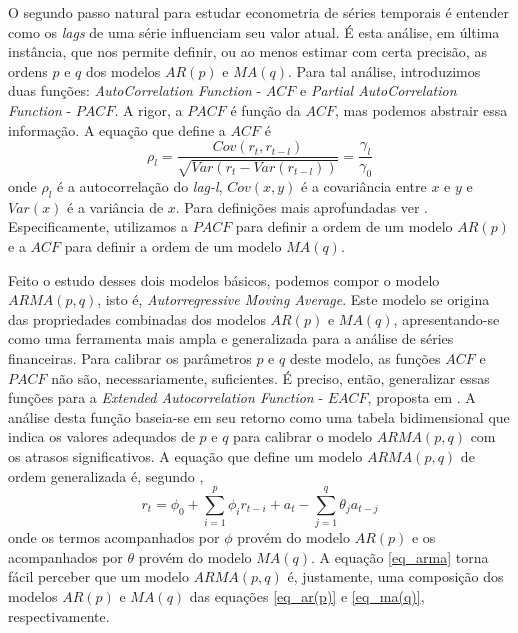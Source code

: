 \documentclass[12pt]{article}
\begin{document}
O segundo passo natural para estudar econometria de séries temporais é entender como os \textit{lags} de uma série influenciam seu valor atual. É esta análise, em última instância, que nos permite definir, ou ao menos estimar com certa precisão, as ordens $p$ e $q$ dos modelos $AR(p)$ e $MA(q)$. Para tal análise, introduzimos duas funções: \textit{AutoCorrelation Function } - $ACF $ e \textit{Partial AutoCorrelation Function } - $ PACF $. A rigor, a $ PACF $ é função da $ ACF $, mas podemos abstrair essa informação. A equação que define a $ ACF $ é
\begin{equation}\label{eq_acf}
\rho_{l}=\dfrac{Cov(r_{t},r_{t-l})}{\sqrt{Var(r_{t}-Var(r_{t-l}))}}=\dfrac{\gamma_{l}}{\gamma_{0}}
\end{equation}
onde $\rho_{l}$ é a autocorrelação do \textit{lag-l}, $Cov(x,y)$ é a covariância entre $x$ e $y$ e $Var(x)$ é a variância de $x$. Para definições mais aprofundadas ver \cite{Tsay}. Especificamente, utilizamos a $PACF$ para definir a ordem de um modelo $AR(p)$ e a $ACF$ para definir a ordem de um modelo $MA(q)$.

Feito o estudo desses dois modelos básicos, podemos compor o modelo $ARMA(p,q)$, isto
é, \textit{Autorregressive Moving Average}. Este modelo se origina das propriedades combinadas
dos modelos $AR(p)$ e $MA(q)$, apresentando-se como uma ferramenta mais ampla e
generalizada para a análise de séries financeiras. Para calibrar os parâmetros $p$ e $q$ deste
modelo, as funções $ ACF $ e $ PACF $ não são, necessariamente, suficientes. É preciso, então,
generalizar essas funções para a \textit{Extended Autocorrelation Function }- $ EACF $, proposta em \cite{Tsay-Tiao1984}. A análise desta função baseia-se em seu retorno como uma tabela bidimensional que indica os valores adequados de $p$ e $q$ para calibrar o modelo $ARMA(p,q)$ com os atrasos significativos. A equação que define um modelo $ARMA(p,q)$ de ordem generalizada é, segundo \cite{Tsay},
\begin{equation}\label{eq_arma}
r_{t}=\phi_{0}+\sum_{i=1}^{p}\phi_{i}r_{t-i}+a_{t}-\sum_{j=1}^{q}\theta_{j}a_{t-j}
\end{equation}
onde os termos acompanhados por $\phi$ provém do modelo $AR(p)$ e os acompanhados por $\theta$ provém do modelo $MA(q)$. A equação \ref{eq_arma} torna fácil perceber que um modelo $ARMA(p,q)$ é, justamente, uma composição dos modelos $AR(p)$ e $MA(q)$ das equações \ref{eq_ar(p)} e \ref{eq_ma(q)}, respectivamente. 
\end{document}
